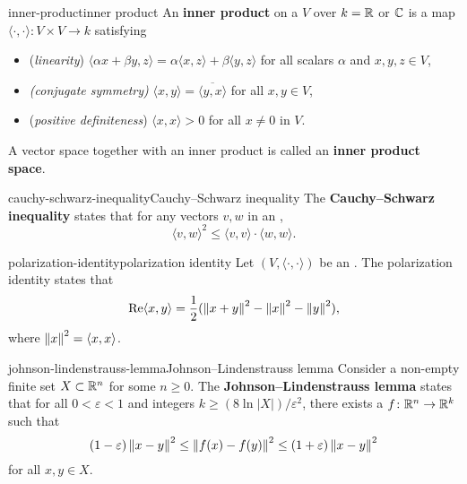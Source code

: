 \begin{topic}{inner-product}{inner product}
    An \textbf{inner product} on a  $V$ over $k = \mathbb{R}$ or $\mathbb{C}$ is a map $\langle \cdot, \cdot \rangle \colon V \times V \to k$ satisfying
    \begin{itemize}
        \item (\textit{linearity}) $\langle \alpha x + \beta y, z \rangle = \alpha \langle x, z \rangle + \beta \langle y, z \rangle$ for all scalars $\alpha$ and $x, y, z \in V$,
        \item \textit{(conjugate symmetry)} $\langle x, y \rangle = \overline{\langle y, x \rangle}$ for all $x, y \in V$,
        \item (\textit{positive definiteness}) $\langle x, x \rangle > 0$ for all $x \ne 0$ in $V$.
    \end{itemize}
    A vector space together with an inner product is called an \textbf{inner product space}.
\end{topic}

\begin{topic}{cauchy-schwarz-inequality}{Cauchy--Schwarz inequality}
    The \textbf{Cauchy--Schwarz inequality} states that for any vectors $v, w$ in an ,
    \[ \langle v, w \rangle^2 \le \langle v, v \rangle \cdot \langle w, w \rangle . \]
\end{topic}

\begin{topic}{polarization-identity}{polarization identity}
    Let $(V, \langle \cdot, \cdot \rangle)$ be an . The polarization identity states that
    \[ \operatorname{Re} \langle x, y \rangle = \frac{1}{2} ( \left\|x + y\right\|^2 - \left\|x\right\|^2 - \left\|y\right\|^2 ) , \]
    where $\left\|x\right\|^2 = \langle x, x \rangle$.
\end{topic}

\begin{topic}{johnson-lindenstrauss-lemma}{Johnson--Lindenstrauss lemma}
    Consider a non-empty finite set $X \subset \mathbb{R}^n$ for some $n \ge 0$. The \textbf{Johnson--Lindenstrauss lemma} states that for all $0 < \varepsilon < 1$ and integers $k \ge (8 \ln |X|) / \varepsilon^2$, there exists a  $f \colon \mathbb{R}^n \to \mathbb{R}^k$ such that
    \[ (1 - \varepsilon) \left\|x - y\right\|^2 \le \left\|f(x) - f(y)\right\|^2 \le (1 + \varepsilon) \left\|x - y\right\|^2 \]
    for all $x, y \in X$.
\end{topic}

